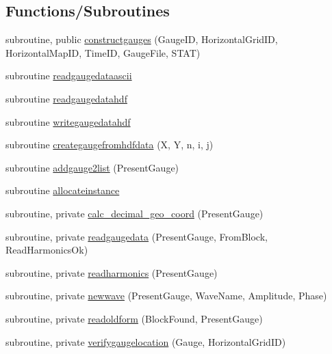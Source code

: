 \subsection*{Functions/\+Subroutines}
\begin{DoxyCompactItemize}
\item 
subroutine, public \mbox{\hyperlink{namespacemodulegauge_a5f441d56f4c693dc4323df1e0d702ea6}{constructgauges}} (Gauge\+ID, Horizontal\+Grid\+ID, Horizontal\+Map\+ID, Time\+ID, Gauge\+File, S\+T\+AT)
\item 
subroutine \mbox{\hyperlink{namespacemodulegauge_a6f6a7638c9e37ab7f5461866ec475f03}{readgaugedataascii}}
\item 
subroutine \mbox{\hyperlink{namespacemodulegauge_a26f00d7d5cd5edd1ce28da62855cb19f}{readgaugedatahdf}}
\item 
subroutine \mbox{\hyperlink{namespacemodulegauge_a473e631b98b7b3cb869f4ede62f77425}{writegaugedatahdf}}
\item 
subroutine \mbox{\hyperlink{namespacemodulegauge_a986286ef5f7c779896aa9d9797f840cd}{creategaugefromhdfdata}} (X, Y, n, i, j)
\item 
subroutine \mbox{\hyperlink{namespacemodulegauge_a672a5d3f45d4bf6b413012a0705ca328}{addgauge2list}} (Present\+Gauge)
\item 
subroutine \mbox{\hyperlink{namespacemodulegauge_a1aea609b0bda24026589e2d67bf3e0ab}{allocateinstance}}
\item 
subroutine, private \mbox{\hyperlink{namespacemodulegauge_adb09b4f645d53ae4da6e979cbda1d5ea}{calc\+\_\+decimal\+\_\+geo\+\_\+coord}} (Present\+Gauge)
\item 
subroutine, private \mbox{\hyperlink{namespacemodulegauge_a6be887d8098d9844b158ef75048c3473}{readgaugedata}} (Present\+Gauge, From\+Block, Read\+Harmonics\+Ok)
\item 
subroutine, private \mbox{\hyperlink{namespacemodulegauge_a9095cfa51e7b4150e1d3889efe30b265}{readharmonics}} (Present\+Gauge)
\item 
subroutine, private \mbox{\hyperlink{namespacemodulegauge_ad253767480082a0c9e00cc725e85786e}{newwave}} (Present\+Gauge, Wave\+Name, Amplitude, Phase)
\item 
subroutine, private \mbox{\hyperlink{namespacemodulegauge_a046651f5fe7a0df46688f6d3467b09b5}{readoldform}} (Block\+Found, Present\+Gauge)
\item 
subroutine, private \mbox{\hyperlink{namespacemodulegauge_a5143391f003e2c838204ca20768435a4}{verifygaugelocation}} (Gauge, Horizontal\+Grid\+ID)

\end{DoxyCompactItemize}
